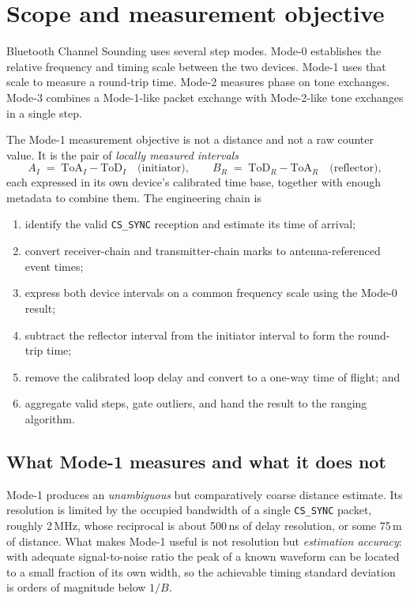 \documentclass[11pt,a4paper]{article}
\newcommand{\ToD}{\mathrm{ToD}}
\newcommand{\ToA}{\mathrm{ToA}}
\newcommand{\code}[1]{\texttt{\small #1}}
\begin{document}
\newpage
\tableofcontents
\newpage
{}
\setcounter{page}{1}

\section{Scope and measurement objective}

Bluetooth Channel Sounding uses several step modes. Mode-0 establishes the relative frequency
and timing scale between the two devices. Mode-1 uses that scale to measure a round-trip time.
Mode-2 measures phase on tone exchanges. Mode-3 combines a Mode-1-like packet exchange with
Mode-2-like tone exchanges in a single step.

The Mode-1 measurement objective is not a distance and not a raw counter value. It is the pair of
\emph{locally measured intervals}
\[
A_I \;=\; \ToA_I - \ToD_I \quad\text{(initiator)}, \qquad
B_R \;=\; \ToD_R - \ToA_R \quad\text{(reflector)},
\]
each expressed in its own device's calibrated time base, together with enough metadata to
combine them. The engineering chain is

\begin{enumerate}[leftmargin=1.6em,itemsep=1pt]
  \item identify the valid \code{CS\_SYNC} reception and estimate its time of arrival;
  \item convert receiver-chain and transmitter-chain marks to antenna-referenced event times;
  \item express both device intervals on a common frequency scale using the Mode-0 result;
  \item subtract the reflector interval from the initiator interval to form the round-trip time;
  \item remove the calibrated loop delay and convert to a one-way time of flight; and
  \item aggregate valid steps, gate outliers, and hand the result to the ranging algorithm.
\end{enumerate}

\subsection{What Mode-1 measures and what it does not}

Mode-1 produces an \emph{unambiguous} but comparatively coarse distance estimate. Its resolution
is limited by the occupied bandwidth of a single \code{CS\_SYNC} packet, roughly 2\,MHz, whose
reciprocal is about 500\,ns of delay resolution, or some 75\,m of distance. What makes Mode-1
useful is not resolution but \emph{estimation accuracy}: with adequate signal-to-noise ratio the
peak of a known waveform can be located to a small fraction of its own width, so the achievable
timing standard deviation is orders of magnitude below $1/B$.
\end{document}
